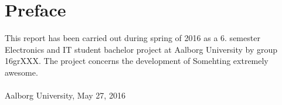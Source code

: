 \chapter*{Preface}\label{ch:forord}%
This report has been carried out during spring of 2016 as a 6. semester Electronics and IT student bachelor project at Aalborg University by group 16grXXX. The project concerns the development of Somehting extremely awesome.
\\\\

\vspace{0.5\baselineskip}\hfill Aalborg University, May 27, 2016

